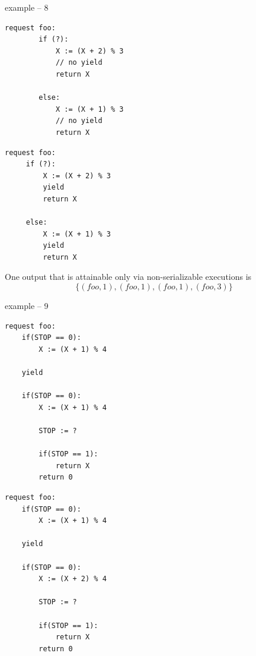 \newpage


example – 8

\noindent
\begin{minipage}[t]{0.45\textwidth}
	\begin{lstlisting}[caption={foo (serializable)}]
	request foo: 
	    if (?):
	        X := (X + 2) % 3 
	        // no yield
	        return X
	
	    else:
	        X := (X + 1) % 3
	        // no yield
	        return X
		\end{lstlisting}
\end{minipage}
\hfill
\begin{minipage}[t]{0.45\textwidth}
\begin{lstlisting}[caption={foo (non serializable)}]
request foo: 
     if (?):
         X := (X + 2) % 3 
         yield
         return X

     else:
         X := (X + 1) % 3
         yield
         return X
	\end{lstlisting}
\end{minipage}

One output that is attainable only via non-serializable executions is 
\[
\{(foo,1),(foo,1),(foo,1),(foo,3)\}
\]




example – 9

\noindent
\begin{minipage}[t]{0.45\textwidth}
	\begin{lstlisting}[caption={foo (serializable)}]
request foo:
    if(STOP == 0):
        X := (X + 1) % 4

    yield

    if(STOP == 0):
        X := (X + 1) % 4

        STOP := ?
        
        if(STOP == 1):
	        return X
        return 0
	\end{lstlisting}
\end{minipage}
\hfill
\begin{minipage}[t]{0.45\textwidth}
	\begin{lstlisting}[caption={foo (non serializable)}]
request foo:
    if(STOP == 0):
        X := (X + 1) % 4

    yield

    if(STOP == 0):
        X := (X + 2) % 4

        STOP := ?
        
        if(STOP == 1):
	        return X
        return 0
	\end{lstlisting}
\end{minipage}


